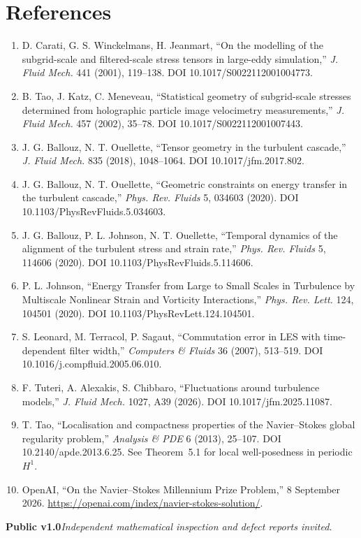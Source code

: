 \documentclass[11pt,a4paper]{article}
\begin{document}
\section*{References}
\begin{enumerate}
\item D. Carati, G. S. Winckelmans, H. Jeanmart, ``On the modelling of the subgrid-scale and filtered-scale stress tensors in large-eddy simulation,'' \emph{J. Fluid Mech.} 441 (2001), 119--138. DOI 10.1017/S0022112001004773.
\item B. Tao, J. Katz, C. Meneveau, ``Statistical geometry of subgrid-scale stresses determined from holographic particle image velocimetry measurements,'' \emph{J. Fluid Mech.} 457 (2002), 35--78. DOI 10.1017/S0022112001007443.
\item J. G. Ballouz, N. T. Ouellette, ``Tensor geometry in the turbulent cascade,'' \emph{J. Fluid Mech.} 835 (2018), 1048--1064. DOI 10.1017/jfm.2017.802.
\item J. G. Ballouz, N. T. Ouellette, ``Geometric constraints on energy transfer in the turbulent cascade,'' \emph{Phys. Rev. Fluids} 5, 034603 (2020). DOI 10.1103/PhysRevFluids.5.034603.
\item J. G. Ballouz, P. L. Johnson, N. T. Ouellette, ``Temporal dynamics of the alignment of the turbulent stress and strain rate,'' \emph{Phys. Rev. Fluids} 5, 114606 (2020). DOI 10.1103/PhysRevFluids.5.114606.
\item P. L. Johnson, ``Energy Transfer from Large to Small Scales in Turbulence by Multiscale Nonlinear Strain and Vorticity Interactions,'' \emph{Phys. Rev. Lett.} 124, 104501 (2020). DOI 10.1103/PhysRevLett.124.104501.
\item S. Leonard, M. Terracol, P. Sagaut, ``Commutation error in LES with time-dependent filter width,'' \emph{Computers \& Fluids} 36 (2007), 513--519. DOI 10.1016/j.compfluid.2005.06.010.
\item F. Tuteri, A. Alexakis, S. Chibbaro, ``Fluctuations around turbulence models,'' \emph{J. Fluid Mech.} 1027, A39 (2026). DOI 10.1017/jfm.2025.11087.
\item T. Tao, ``Localisation and compactness properties of the Navier--Stokes global regularity problem,'' \emph{Analysis \& PDE} 6 (2013), 25--107. DOI 10.2140/apde.2013.6.25. See Theorem~5.1 for local well-posedness in periodic $H^1$.
\item OpenAI, ``On the Navier--Stokes Millennium Prize Problem,'' 8 September 2026. \url{https://openai.com/index/navier-stokes-solution/}.
\end{enumerate}

\vfill
\begin{center}
\textbf{Public v1.0}\qquad\textit{Independent mathematical inspection and defect reports invited.}
\end{center}
\end{document}
